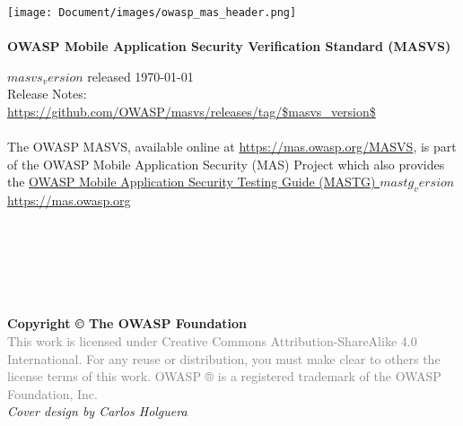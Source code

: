 \thispagestyle{empty} %

\texttt{[image: Document/images/owasp\_mas\_header.png]} \\ \\

\large{\textbf{OWASP Mobile Application Security Verification Standard (MASVS)} }

$masvs_version$ released \today \\

Release Notes: \url{https://github.com/OWASP/masvs/releases/tag/$masvs_version$} \\ \\


The OWASP MASVS, available online at \url{https://mas.owasp.org/MASVS}, is part of the OWASP Mobile Application Security (MAS) Project which also provides the \href{https://mas.owasp.org/MASTG}{OWASP Mobile Application Security Testing Guide (MASTG) $mastg_version$} \\

\url{https://mas.owasp.org} \\ \\ \\ \\ \\ \\ \\

\textbf{Copyright © The OWASP Foundation} \\

\footnotesize{\textcolor{gray}{This work is licensed under Creative Commons Attribution-ShareAlike 4.0 International. For any reuse or distribution, you must make clear to others the license terms of this work.
OWASP ® is a registered trademark of the OWASP Foundation, Inc.} }\\


\emph{Cover design by Carlos Holguera}